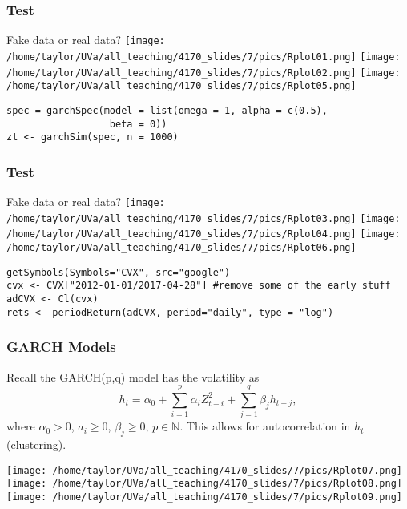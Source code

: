 \documentclass{beamer}
\begin{document}

\begin{frame}[fragile]
\frametitle{Test}

Fake data or real data?
\texttt{[image: /home/taylor/UVa/all\_teaching/4170\_slides/7/pics/Rplot01.png]}
\texttt{[image: /home/taylor/UVa/all\_teaching/4170\_slides/7/pics/Rplot02.png]}
\texttt{[image: /home/taylor/UVa/all\_teaching/4170\_slides/7/pics/Rplot05.png]}
\pause

\begin{verbatim}
spec = garchSpec(model = list(omega = 1, alpha = c(0.5), 
                  beta = 0))
zt <- garchSim(spec, n = 1000)
\end{verbatim}


\end{frame}


\begin{frame}[fragile]
\frametitle{Test}

Fake data or real data?
\texttt{[image: /home/taylor/UVa/all\_teaching/4170\_slides/7/pics/Rplot03.png]}
\texttt{[image: /home/taylor/UVa/all\_teaching/4170\_slides/7/pics/Rplot04.png]}
\texttt{[image: /home/taylor/UVa/all\_teaching/4170\_slides/7/pics/Rplot06.png]}
\pause

\begin{verbatim}
getSymbols(Symbols="CVX", src="google")
cvx <- CVX["2012-01-01/2017-04-28"] #remove some of the early stuff
adCVX <- Cl(cvx)
rets <- periodReturn(adCVX, period="daily", type = "log")
\end{verbatim}


\end{frame}


\begin{frame}[fragile]
\frametitle{GARCH Models}

Recall the GARCH(p,q) model has the volatility as  
\[
h_t = \alpha_0 + \sum_{i=1}^p \alpha_i Z^2_{t-i} + \sum_{j=1}^q \beta_j h_{t-j},
\]
where $\alpha_0 > 0$, $a_i \ge 0$, $\beta_j \ge 0$, $p \in \mathbb{N}$. This allows for autocorrelation in $h_t$  (clustering).

\texttt{[image: /home/taylor/UVa/all\_teaching/4170\_slides/7/pics/Rplot07.png]}
\texttt{[image: /home/taylor/UVa/all\_teaching/4170\_slides/7/pics/Rplot08.png]}
\texttt{[image: /home/taylor/UVa/all\_teaching/4170\_slides/7/pics/Rplot09.png]}


\end{frame}
\end{document}
